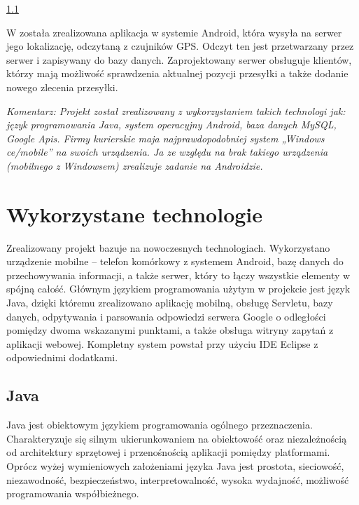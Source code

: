 \documentclass[eng,printmode,oneside]{mgr}
\begin{document}
\ref{}

W została zrealizowana aplikacja w systemie Android, która wysyła na serwer jego
lokalizację, odczytaną z czujników GPS. Odczyt ten jest przetwarzany przez
serwer i zapisywany do bazy danych. Zaprojektowany serwer obsługuje klientów,
którzy mają możliwość sprawdzenia aktualnej pozycji przesyłki a także dodanie
nowego zlecenia przesyłki.  

\emph{\color{komentarz}
Komentarz: Projekt został zrealizowany z wykorzystaniem takich
technologi jak: język programowania Java, system operacyjny Android, baza danych
MySQL, Google Apis. Firmy kurierskie maja najprawdopodobniej system „Windows
ce/mobile” na swoich urządzenia. Ja ze względu na brak takiego urządzenia
(mobilnego z Windowsem) zrealizuje zadanie na Androidzie.
}

\chapter{Wykorzystane technologie}

Zrealizowany projekt bazuje na nowoczesnych technologiach.
Wykorzystano urządzenie mobilne -- telefon komórkowy z systemem
Android, bazę danych do przechowywania informacji, a także serwer, który to
łączy wszystkie elementy w spójną całość. Głównym językiem
programowania użytym w projekcie jest język Java, dzięki któremu
zrealizowano aplikację mobilną, obsługę Servletu, bazy danych, odpytywania i
parsowania odpowiedzi serwera Google o odległości pomiędzy dwoma wskazanymi
punktami, a także obsługa witryny zapytań z aplikacji webowej. Kompletny system
powstał przy użyciu IDE Eclipse z odpowiednimi dodatkami.

\section{Java}

Java jest obiektowym językiem programowania ogólnego przeznaczenia.
Charakteryzuje się silnym ukierunkowaniem na obiektowość oraz niezależnością od
architektury sprzętowej i przenośnością aplikacji pomiędzy platformami.
Oprócz wyżej wymieniowych założeniami języka Java jest prostota, sieciowość,
niezawodność, bezpieczeństwo, interpretowalność, wysoka wydajność, możliwość
programowania współbieżnego.
\end{document}
